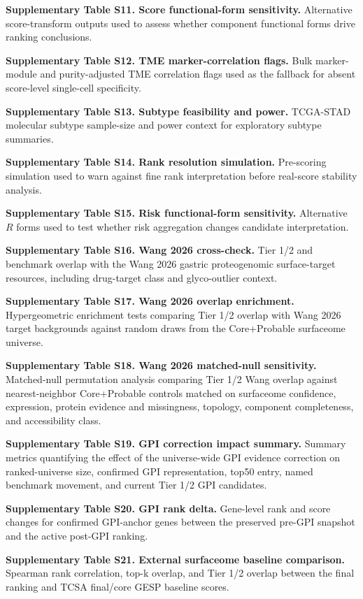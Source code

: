 \documentclass[twocolumn]{article}
\begin{document}
\textbf{Supplementary Table S11. Score functional-form sensitivity.} Alternative score-transform outputs used to assess whether component functional forms drive ranking conclusions.

\textbf{Supplementary Table S12. TME marker-correlation flags.} Bulk marker-module and purity-adjusted TME correlation flags used as the fallback for absent score-level single-cell specificity.

\textbf{Supplementary Table S13. Subtype feasibility and power.} TCGA-STAD molecular subtype sample-size and power context for exploratory subtype summaries.

\textbf{Supplementary Table S14. Rank resolution simulation.} Pre-scoring simulation used to warn against fine rank interpretation before real-score stability analysis.

\textbf{Supplementary Table S15. Risk functional-form sensitivity.} Alternative $R$ forms used to test whether risk aggregation changes candidate interpretation.

\textbf{Supplementary Table S16. Wang 2026 cross-check.} Tier 1/\allowbreak{}2 and benchmark overlap with the Wang 2026 gastric proteogenomic surface-target resources, including drug-target class and glyco-outlier context.

\textbf{Supplementary Table S17. Wang 2026 overlap enrichment.} Hypergeometric enrichment tests comparing Tier 1/\allowbreak{}2 overlap with Wang 2026 target backgrounds against random draws from the Core+\allowbreak{}Probable surfaceome universe.

\textbf{Supplementary Table S18. Wang 2026 matched-null sensitivity.} Matched-null permutation analysis comparing Tier 1/\allowbreak{}2 Wang overlap against nearest-neighbor Core+\allowbreak{}Probable controls matched on surfaceome confidence, expression, protein evidence and missingness, topology, component completeness, and accessibility class.

\textbf{Supplementary Table S19. GPI correction impact summary.} Summary metrics quantifying the effect of the universe-wide GPI evidence correction on ranked-universe size, confirmed GPI representation, top50 entry, named benchmark movement, and current Tier 1/\allowbreak{}2 GPI candidates.

\textbf{Supplementary Table S20. GPI rank delta.} Gene-level rank and score changes for confirmed GPI-anchor genes between the preserved pre-GPI snapshot and the active post-GPI ranking.

\textbf{Supplementary Table S21. External surfaceome baseline comparison.} Spearman rank correlation, top-k overlap, and Tier 1/\allowbreak{}2 overlap between the final ranking and TCSA final/\allowbreak{}core GESP baseline scores.
\end{document}
